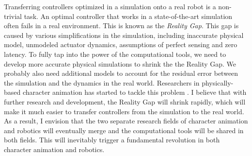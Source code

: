 Transferring controllers optimized in a simulation onto a real robot is a non-trivial task. An optimal controller that works in a state-of-the-art simulation often fails in a real environment. This is known as the \emph{Reality Gap}. This gap is caused by various simplifications in the simulation, including inaccurate physical model, unmodeled actuator dynamics, assumptions of perfect sensing and zero latency. To fully tap into the power of the computational tools, we need to develop more accurate physical simulations to shrink the the Reality Gap. We probably also need additional models to account for the residual error between the simulation and the dynamics in the real world. Researchers in physically-based character animation has started to tackle this problem \cite{Bharaj:2015,Megaro:2015} . I believe that with further research and development,  the Reality Gap will shrink rapidly, which will make it much easier to transfer controllers from the simulation to the real world. As a result, I envision that the two separate research fields of character animation and robotics will eventually merge and the computational tools will be shared in both fields. This will inevitably trigger a fundamental revolution in both character animation and robotics.


